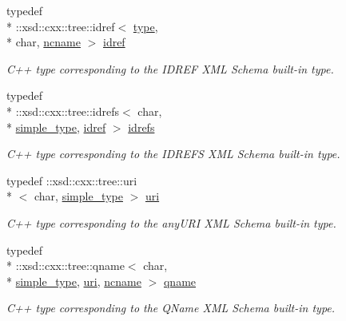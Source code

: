 \begin{DoxyCompactItemize}
typedef \\*
\-::xsd\-::cxx\-::tree\-::idref$<$ \hyperlink{namespacexml__schema_a3d277dc807f2e4ec4261dcef5c04a836}{type}, \\*
char, \hyperlink{namespacexml__schema_a926a5ddb21b27435d0206310d8fc67b7}{ncname} $>$ \hyperlink{namespacexml__schema_ac4af625f2450257be84f5475dbfe8fdd}{idref}
\begin{DoxyCompactList}\small\item\em C++ type corresponding to the I\-D\-R\-E\-F X\-M\-L Schema built-\/in type. \end{DoxyCompactList}\item 
typedef \\*
\-::xsd\-::cxx\-::tree\-::idrefs$<$ char, \\*
\hyperlink{namespacexml__schema_a44789bb4367951bcf8ae867cb983324d}{simple\-\_\-type}, \hyperlink{namespacexml__schema_ac4af625f2450257be84f5475dbfe8fdd}{idref} $>$ \hyperlink{namespacexml__schema_adb5f7e4c5a09caf31f94ace50b148674}{idrefs}
\begin{DoxyCompactList}\small\item\em C++ type corresponding to the I\-D\-R\-E\-F\-S X\-M\-L Schema built-\/in type. \end{DoxyCompactList}\item 
typedef \-::xsd\-::cxx\-::tree\-::uri\\*
$<$ char, \hyperlink{namespacexml__schema_a44789bb4367951bcf8ae867cb983324d}{simple\-\_\-type} $>$ \hyperlink{namespacexml__schema_a2518fddf119bd258d7443408863ee457}{uri}
\begin{DoxyCompactList}\small\item\em C++ type corresponding to the any\-U\-R\-I X\-M\-L Schema built-\/in type. \end{DoxyCompactList}\item 
typedef \\*
\-::xsd\-::cxx\-::tree\-::qname$<$ char, \\*
\hyperlink{namespacexml__schema_a44789bb4367951bcf8ae867cb983324d}{simple\-\_\-type}, \hyperlink{namespacexml__schema_a2518fddf119bd258d7443408863ee457}{uri}, \hyperlink{namespacexml__schema_a926a5ddb21b27435d0206310d8fc67b7}{ncname} $>$ \hyperlink{namespacexml__schema_af47d5d85d1b1714be503513b1c09c079}{qname}
\begin{DoxyCompactList}\small\item\em C++ type corresponding to the Q\-Name X\-M\-L Schema built-\/in type. \end{DoxyCompactList}\item 

\end{DoxyCompactItemize}

